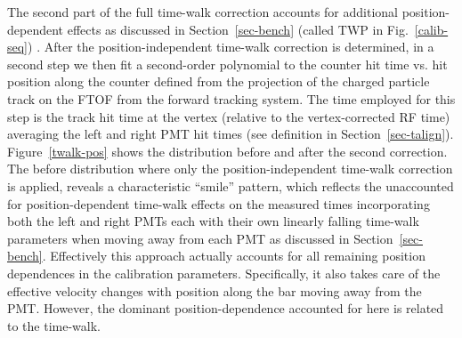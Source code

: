 \documentclass[final,3p,twocolumn]{elsarticle}
\begin{document}
The second part of the full time-walk correction accounts for additional position-dependent effects as
discussed in Section~\ref{sec-bench} (called TWP in Fig.~\ref{calib-seq}) . After the position-independent
time-walk correction is determined, in a second step we then fit a second-order polynomial to the counter hit time
vs. hit position along the counter defined from the projection of the charged particle track on the FTOF from
the forward tracking system. The time employed for this step is the track hit time at the vertex (relative
to the vertex-corrected RF time) averaging the left and right PMT hit times (see definition in
Section~\ref{sec-talign}). Figure~\ref{twalk-pos} shows the distribution before and after the second correction.
The before distribution where only the position-independent time-walk correction is applied, reveals a
characteristic ``smile'' pattern, which reflects the unaccounted for position-dependent time-walk effects on
the measured times incorporating both the left and right PMTs each with their own linearly falling time-walk
parameters when moving away from each PMT as discussed in Section~\ref{sec-bench}. Effectively this approach
actually accounts for all remaining position dependences in the calibration parameters. Specifically, it also takes
care of the effective velocity changes with position along the bar moving away from the PMT. However, the
dominant position-dependence accounted for here is related to the time-walk.
\end{document}
